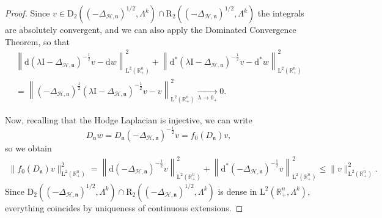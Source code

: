\documentclass[AHL,Unicode,longabstracts,published]{cedram}
\newcommand{\bbR}{\mathbb{R}}
\newcommand{\rmd}{\mathrm{d}}
\newcommand{\rmD}{\mathrm{D}}
\newcommand{\rmL}{\mathrm{L}}
\newcommand{\rmR}{\mathrm{R}}
\newcommand{\rmI}{\mathrm{I}}
\newcommand{\clH}{\mathcal{H}}
\newcommand{\fkn}{\mathfrak{n}}
\begin{document}
\begin{proof}
Since $v\in\rmD_2((-\Delta_{\clH,\fkn})^{1/2},\Lambda^k)\cap\rmR _2((-\Delta_{\clH,\fkn})^{1/2},\Lambda^k)$ the integrals are absolutely convergent, and we can also apply the Dominated Convergence Theorem, so that
\begin{multline}\label{eqref:resolvConvSquareRootL2}
\left\| \rmd\left(\lambda\rmI -\Delta_{\clH,\fkn}\right)^{-\frac{1}{2}} v -\rmd w\right\|_{\rmL^2\left(\bbR^n_+\right)}^2+\left\| \rmd^\ast\left(\lambda\rmI -\Delta_{\clH,\fkn}\right)^{-\frac{1}{2}} v -\rmd^\ast w\right\|_{\rmL^2\left(\bbR^n_+\right)}^2\\
=\left\| \left(-\Delta_{\clH,\fkn}\right)^{\frac{1}{2}}\left(\lambda\rmI -\Delta_{\clH,\fkn}\right)^{-\frac{1}{2}} v -v\right\|_{\rmL^2\left(\bbR^n_+\right)}^2 \xrightarrow[\lambda \rightarrow 0_+]{}0.
\end{multline}

Now, recalling that the Hodge Laplacian is injective, we can write
\[
D_{\fkn}w= D_{\fkn}\left(-\Delta_{\clH,\fkn}\right)^{-\frac{1}{2}}v = f_0(D_{\fkn})v,
\]
so we obtain
\begin{align*}
\| f_0(D_\fkn)v\|_{\rmL^2\left(\bbR^n_+\right)}^2 = \left\| \rmd\left(-\Delta_{\clH,\fkn}\right)^{-\frac{1}{2}} v \right\|_{\rmL^2\left(\bbR^n_+\right)}^2+\left\| \rmd^\ast\left(-\Delta_{\clH,\fkn}\right)^{-\frac{1}{2}} v\right\|_{\rmL^2\left(\bbR^n_+\right)}^2 \leqslant \| v \|_{\rmL^2\left(\bbR^n_+\right)}^2.
\end{align*}
Since $\rmD_2((-\Delta_{\clH,\fkn})^{1/2},\Lambda^k)\cap\rmR_2((-\Delta_{\clH,\fkn})^{1/2},\Lambda^k)$ is dense in $\rmL^2(\bbR^n_+,\Lambda^k)$, everything coincides by uniqueness of continuous extensions.


\end{proof}
\end{document}
